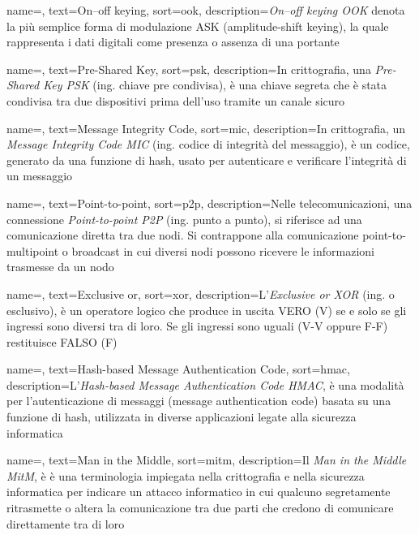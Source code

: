  {
    name=,
    text=On–off keying,
    sort=ook,
    description={\emph{On–off keying OOK} denota la più semplice forma di modulazione ASK (amplitude-shift keying), la quale rappresenta i dati digitali come presenza o assenza di una portante}
}

 {
    name=,
    text=Pre-Shared Key,
    sort=psk,
    description={In crittografia, una \emph{Pre-Shared Key PSK} (ing. chiave pre condivisa), è una chiave segreta che è stata condivisa tra due dispositivi prima dell'uso tramite un canale sicuro}
}

 {
    name=,
    text=Message Integrity Code,
    sort=mic,
    description={In crittografia, un \emph{Message Integrity Code MIC} (ing. codice di integrità del messaggio), è un codice, generato da una funzione di hash, usato per autenticare e verificare l'integrità di un messaggio}
}

 {
    name=,
    text=Point-to-point,
    sort=p2p,
    description={Nelle telecomunicazioni, una connessione \emph{Point-to-point P2P} (ing. punto a punto), si riferisce ad una comunicazione diretta tra due nodi. Si contrappone alla comunicazione point-to-multipoint o broadcast in cui diversi nodi possono ricevere le informazioni trasmesse da un nodo}
}

 {
    name=,
    text=Exclusive or,
    sort=xor,
    description={L'\emph{Exclusive or XOR} (ing. o esclusivo), è un operatore logico che produce in uscita VERO (V) se e solo se gli ingressi sono diversi tra di loro. Se gli ingressi sono uguali (V-V oppure F-F) restituisce FALSO (F)}
}

 {
    name=,
    text=Hash-based Message Authentication Code,
    sort=hmac,
    description={L'\emph{Hash-based Message Authentication Code HMAC}, è una modalità per l'autenticazione di messaggi (message authentication code) basata su una funzione di hash, utilizzata in diverse applicazioni legate alla sicurezza informatica}
}

 {
    name=,
    text=Man in the Middle,
    sort=mitm,
    description={Il \emph{Man in the Middle MitM}, è è una terminologia impiegata nella crittografia e nella sicurezza informatica per indicare un attacco informatico in cui qualcuno segretamente ritrasmette o altera la comunicazione tra due parti che credono di comunicare direttamente tra di loro}
}
